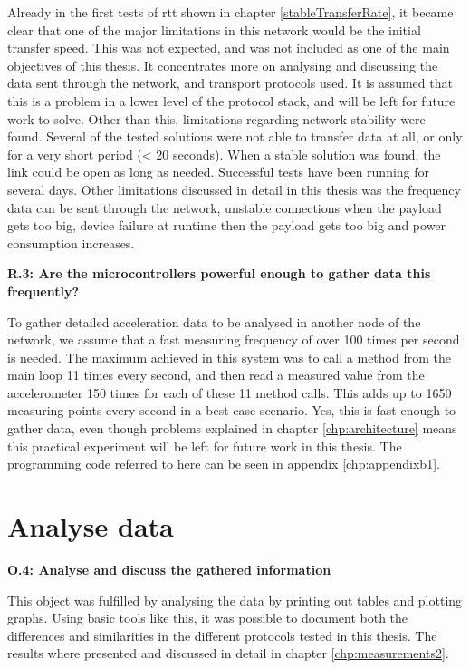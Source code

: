 \noindent Already in the first tests of \gls{rtt} shown in chapter \ref{stableTransferRate}, it became clear that one of the major limitations in this network would be the initial transfer speed. This was not expected, and was not included as one of the main objectives of this thesis. It concentrates more on analysing and discussing the data sent through the network, and transport protocols used. It is assumed that this is a problem in a lower level of the protocol stack, and will be left for future work to solve. Other than this, limitations regarding network stability were found. Several of the tested solutions were not able to transfer data at all, or only for a very short period (< 20 seconds). When a stable solution was found, the link could be open as long as needed. Successful tests have been running for several days. Other limitations discussed in detail in this thesis was the frequency data can be sent through the network, unstable connections when the \gls{payload} gets too big, device failure at runtime then the \gls{payload} gets too big and power consumption increases. 

\noindent\textbf{R.3: Are the microcontrollers powerful enough to gather data this frequently?}

\noindent To gather detailed acceleration data to be analysed in another node of the network, we assume that a fast measuring frequency of over 100 times per second is needed. The maximum achieved in this system was to call a method from the main loop 11 times every second, and then read a measured value from the accelerometer 150 times for each of these 11 method calls. This adds up to 1650 measuring points every second in a best case scenario. Yes, this is fast enough to gather data, even though problems explained in chapter \ref{chp:architecture} means this practical experiment will be left for future work in this thesis. The programming code referred to here can be seen in appendix \ref{chp:appendixb1}. 


\section{Analyse data}

\noindent\textbf{O.4: Analyse and discuss the gathered information}

\noindent This object was fulfilled by analysing the data by printing out tables and plotting graphs. Using basic tools like this, it was possible to document both the differences and similarities in the different protocols tested in this thesis. The results where presented and discussed in detail in chapter \ref{chp:measurements2}.


